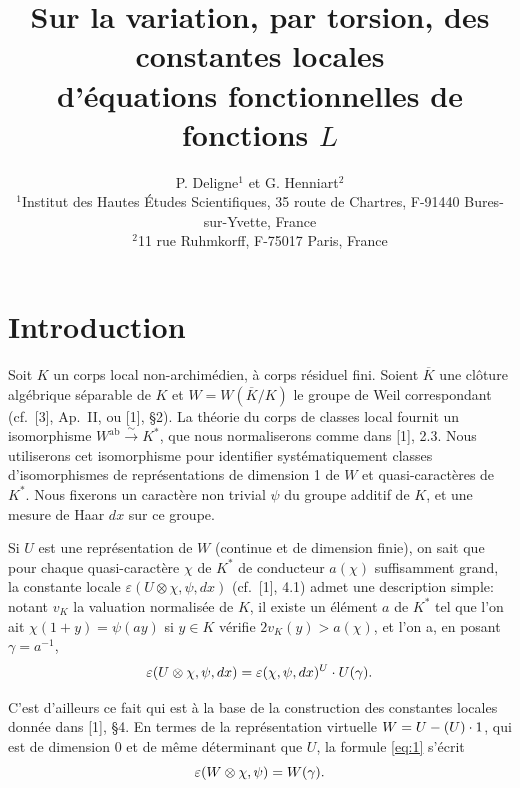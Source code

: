 \documentclass[12pt,a4paper]{article}
\theoremstyle{plain}
\theoremstyle{definition}
\theoremstyle{remark}
\let\dim\relax\let\det\relax
\begin{document}
\title{Sur la variation, par torsion, des constantes locales\\
d'\'equations fonctionnelles de fonctions $L$}
\author{P. Deligne$^1$ et G. Henniart$^2$\\[0.5em]
\small $^1$Institut des Hautes \'Etudes Scientifiques, 35 route de Chartres, F-91440 Bures-sur-Yvette, France\\
\small $^2$11 rue Ruhmkorff, F-75017 Paris, France}
\date{}
\maketitle

\section*{Introduction}

Soit $K$ un corps local non-archim\'edien, \`a corps r\'esiduel fini. Soient $\overline{K}$ une cl\^oture alg\'ebrique s\'eparable de $K$ et $W = W(\overline{K}/K)$ le groupe de Weil correspondant (cf.~[3], Ap.~II, ou [1], \S 2). La th\'eorie du corps de classes local fournit un isomorphisme $W^{\text{ab}} \xrightarrow{\sim} K^*$, que nous normaliserons comme dans [1], 2.3. Nous utiliserons cet isomorphisme pour identifier syst\'ematiquement classes d'isomorphismes de repr\'esentations de dimension 1 de $W$ et quasi-caract\`eres de $K^*$. Nous fixerons un caract\`ere non trivial $\psi$ du groupe additif de $K$, et une mesure de Haar $dx$ sur ce groupe.

Si $U$ est une repr\'esentation de $W$ (continue et de dimension finie), on sait que pour chaque quasi-caract\`ere $\chi$ de $K^*$ de conducteur $a(\chi)$ suffisamment grand, la constante locale $\varepsilon(U \otimes \chi, \psi, dx)$ (cf.~[1], 4.1) admet une description simple: notant $v_K$ la valuation normalis\'ee de $K$, il existe un \'el\'ement $a$ de $K^*$ tel que l'on ait $\chi(1+y) = \psi(ay)$ si $y \in K$ v\'erifie $2v_K(y) > a(\chi)$, et l'on a, en posant $\gamma = a^{-1}$,
\begin{equation}\label{eq:1}
\varepsilon(U \otimes \chi, \psi, dx) = \varepsilon(\chi, \psi, dx)^{\dim U} \cdot \det U(\gamma).
\end{equation}

C'est d'ailleurs ce fait qui est \`a la base de la construction des constantes locales donn\'ee dans [1], \S 4. En termes de la repr\'esentation virtuelle $W = U - (\dim U) \cdot 1$, qui est de dimension 0 et de m\^eme d\'eterminant que $U$, la formule \eqref{eq:1} s'\'ecrit
\begin{equation}\label{eq:2}
\varepsilon(W \otimes \chi, \psi) = \det W(\gamma).
\end{equation}
\end{document}
